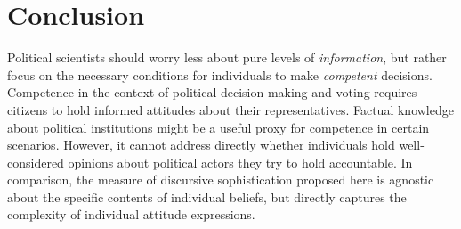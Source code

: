 \documentclass[12pt]{article}
\begin{document}



\section*{Conclusion}

Political scientists should worry less about pure levels of \textit{information}, but rather focus on the necessary conditions for individuals to make \textit{competent} decisions. Competence in the context of political decision-making and voting requires citizens to hold informed attitudes about their representatives. Factual knowledge about political institutions might be a useful proxy for competence in certain scenarios. However, it cannot address directly whether individuals hold well-considered opinions about political actors they try to hold accountable. In comparison, the measure of discursive sophistication proposed here is agnostic about the specific contents of individual beliefs, but directly captures the complexity of individual attitude expressions.
\end{document}
